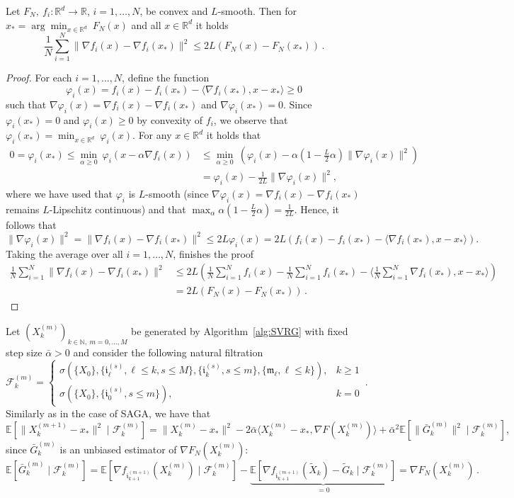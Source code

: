 \documentclass[12pt,openany]{book}
\theoremstyle{definition}
\theoremstyle{definition}
\newcommand{\cF}{\mathcal{F}}
\newcommand{\E}{\mathbb{E}}
\newcommand{\N}{\mathbb{N}}
\newcommand{\R}{\mathbb{R}}
\begin{document}
\begin{lemma}\label{lem:SVRG_aux}
Let $F_N,\ f_i:\R^d\to\R$, $i=1,\dots,N$, be convex and $L$-smooth. Then for $x_\ast =\arg\min_{x\in\R^d}\ F_N(x)$ and all $x\in\R^d$ it holds
\[\frac1N\sum_{i=1}^N \|\nabla f_i(x)-\nabla f_i(x_\ast)\|^2 \le 2L \left(F_N(x)-F_N(x_\ast)\right)\,. \]
\end{lemma}
\begin{proof}
For each $i=1,\dots,N$, define the function
\[\varphi_i(x) = f_i(x)-f_i(x_\ast)-\langle \nabla f_i(x_\ast),x-x_\ast\rangle\ge0 \]
such that $\nabla \varphi_i(x) = \nabla f_i(x)-\nabla f_i(x_\ast)$ and $\nabla \varphi_i(x_\ast) =0$. Since $\varphi_i(x_\ast)=0$ and $\varphi_i(x)\ge0$ by convexity of $f_i$, we observe that $\varphi_i(x_\ast) =\min_{x\in\R^d}\ \varphi_i(x)$. For any $x\in\R^d$ it holds that
\begin{align*}
0=\varphi_i(x_\ast) \le \min_{\alpha\ge0}\ \varphi_i(x-\alpha \nabla f_i(x)) &\le \min_{\alpha\ge0}\ \left(\varphi_i(x)-\alpha (1-\frac{L}2\alpha) \|\nabla \varphi_i(x)\|^2\right)\\
&=\varphi_i(x)-\frac1{2L}\|\nabla \varphi_i(x)\|^2,
\end{align*}
where we have used that $\varphi_i$ is $L$-smooth (since $\nabla \varphi_i(x) = \nabla f_i(x) - \nabla f_i(x_\ast)$ remains $L$-Lipschitz continuous) and that $\max_\alpha \alpha(1-\frac{L}2\alpha) = \frac{1}{2L}$. Hence, it follows that
\[\|\nabla\varphi_i(x)\|^2 = \|\nabla f_i(x)-\nabla f_i(x_\ast)\|^2 \le 2L \varphi_i(x) = 2L\left(f_i(x)-f_i(x_\ast)-\langle \nabla f_i(x_\ast),x-x_\ast\rangle\right).\]
Taking the average over all $i=1,\dots,N$, finishes the proof
\begin{align*}
\frac1N\sum_{i=1}^N \|\nabla f_i(x)-\nabla f_i(x_\ast)\|^2 &\le 2L\left(\frac1N\sum_{i=1}^Nf_i(x)-\frac1N\sum_{i=1}^Nf_i(x_\ast)-\langle\frac1N\sum_{i=1}^N \nabla f_i(x_\ast),x-x_\ast\rangle\right)\\ &= 2L\left(F_N(x)-F_N(x_\ast)\right)\,.
\end{align*}
\end{proof}

Let $(X_k^{(m)})_{k\in\N,\ m=0,\dots,M}$ be generated by Algorithm~\ref{alg:SVRG} with fixed step size $\bar\alpha>0$ and consider the following natural filtration
\[\cF_k^{(m)} = \begin{cases}\sigma(\{X_0\},\{\mathfrak i_\ell^{(s)}, \ell \le k,s\le M\}, \{\mathfrak i_k^{(s)},s\le m\},\{\mathfrak m_\ell,\ell\le k\}), &k\ge1 \\ \sigma(\{X_0\},\{\mathfrak i_0^{(s)},s\le m\}), & k=0 \end{cases}\,. \]
Similarly as in the case of SAGA, we have that
\[\E[\|X_{k}^{(m+1)} - x_\ast\|^2\mid \cF_k^{(m)}] = \|X_k^{(m)}-x_\ast\|^2 - 2\bar\alpha\langle X_k^{(m)}-x_\ast,\nabla F(X_k^{(m)})\rangle +\bar\alpha^2\E[\|\bar G_k^{(m)}\|^2\mid\cF_k^{(m)}], \]
since $\bar G_k^{(m)}$ is an unbiased estimator of $\nabla F_N(X_k^{(m)})$:
\[\E[\bar G_k^{(m)}\mid \cF_k^{(m)}] = \E[\nabla f_{\mathfrak i_{k+1}^{(m+1)}}(X_k^{(m)})\mid \cF_k^{(m)}] - \underbrace{\E[\nabla f_{\mathfrak i_{k+1}^{(m+1)}}(\tilde X_k) - \tilde G_k\mid \cF_k^{(m)}]}_{=0}  = \nabla F_N(X_k^{(m)})\,. \]
\end{document}
